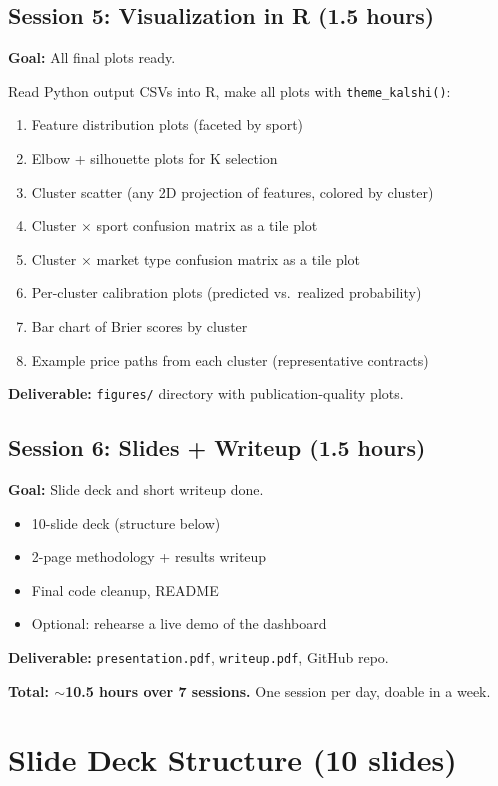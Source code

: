 \documentclass[11pt]{article}
\begin{document}
\subsection*{Session 5: Visualization in R (1.5 hours)}
\textbf{Goal:} All final plots ready.

Read Python output CSVs into R, make all plots with \texttt{theme\_kalshi()}:
\begin{enumerate}[leftmargin=*, itemsep=0pt]
    \item Feature distribution plots (faceted by sport)
    \item Elbow + silhouette plots for K selection
    \item Cluster scatter (any 2D projection of features, colored by cluster)
    \item Cluster $\times$ sport confusion matrix as a tile plot
    \item Cluster $\times$ market type confusion matrix as a tile plot
    \item Per-cluster calibration plots (predicted vs.\ realized probability)
    \item Bar chart of Brier scores by cluster
    \item Example price paths from each cluster (representative contracts)
\end{enumerate}
\textbf{Deliverable:} \texttt{figures/} directory with publication-quality plots.

\subsection*{Session 6: Slides + Writeup (1.5 hours)}
\textbf{Goal:} Slide deck and short writeup done.
\begin{itemize}[leftmargin=*, itemsep=0pt]
    \item 10-slide deck (structure below)
    \item 2-page methodology + results writeup
    \item Final code cleanup, README
    \item Optional: rehearse a live demo of the dashboard
\end{itemize}
\textbf{Deliverable:} \texttt{presentation.pdf}, \texttt{writeup.pdf}, GitHub repo.

\textbf{Total: $\sim$10.5 hours over 7 sessions.} One session per day, doable in a week.

\section{Slide Deck Structure (10 slides)}
\end{document}
